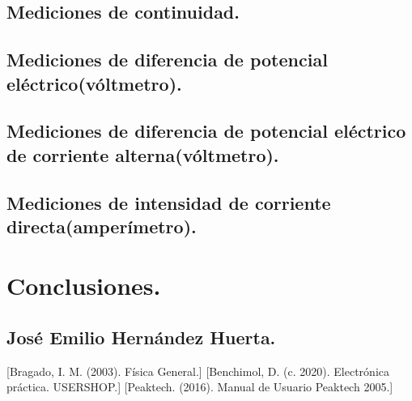 \documentclass[10pt]{article}
\begin{document}
\begin{multicols}{2}
\subsection{Mediciones de continuidad.}


\subsection{Mediciones de diferencia de potencial eléctrico(vóltmetro).}


\subsection{Mediciones de diferencia de potencial eléctrico de corriente alterna(vóltmetro).}


\subsection{Mediciones de intensidad de corriente directa(amperímetro).}


\section{Conclusiones.}

\subsection*{José Emilio Hernández Huerta.}



\begin{thebibliography}{0}
	[Bragado, I. M. (2003). Física General.]
	[Benchimol, D. (c. 2020). Electrónica práctica. USERSHOP.]
	[Peaktech. (2016). Manual de Usuario Peaktech 2005.]
		
\end{thebibliography}

\end{multicols}
\end{document}
